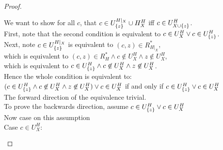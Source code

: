 \begin{proof}
\begin{tabbedproof}
\oo We want to show for all $c$, that $c \in U^{H|_X}_{\{{z}\}} \cup H^H_X$ iff $c \in U^H_{X \cup \{{z}\}}$. \\
\oo First, note that the second condition is equivalent to $c \in U^H_X \vee c \in U^H_{\{{z}\}}$. \\
\oo Next, note $c \in U^{H|_{X}}_{\{{z}\}}$ is equivalent to $(c,z) \in R^*_{H|_{X}}$, \\
\oo which is equivalent to  $(c, z) \in R^*_H \land c \not\in U^H_{X} \land z \not\in U^H_{X}$, \\
\oo which is equivalent to  $c \in U^H_{\{{z}\}} \land c \not\in U^H_{X} \land z \not\in U^H_{X}$. \\
\oo Hence the whole condition is equivalent to:\\
\oox $(c \in U^H_{\{{z}\}} \land c \not\in U^H_{X} \land z \not\in U^H_{X}) \vee c \in U^H_{X}$ if and only if 
    $c \in U^H_{\{{z}\}} \vee c \in U^H_{X}$ \\
\oo The forward direction of the equivalence trivial. \\
\oo To prove the backwards direction, assume $c \in U^H_{\{{z}\}} \vee c \in U^H_{X}$ \\
\ooo Now case on this assumption \\
\ooo Case $c \in U^H_{X}$: \\

\end{tabbedproof}
\end{proof}
